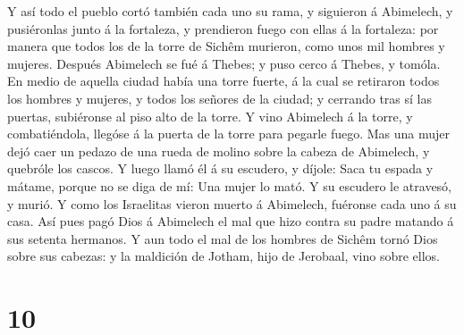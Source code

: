  Y así todo el pueblo cortó también cada uno su rama, y
siguieron á Abimelech, y pusiéronlas junto á la fortaleza, y prendieron
fuego con ellas á la fortaleza: por manera que todos los de la torre de
Sichêm murieron, como unos mil hombres y mujeres. 
Después Abimelech se fué á Thebes; y puso cerco á Thebes, y tomóla.
 En medio de aquella ciudad había una torre fuerte, á la
cual se retiraron todos los hombres y mujeres, y todos los señores de la
ciudad; y cerrando tras sí las puertas, subiéronse al piso alto de la
torre.  Y vino Abimelech á la torre, y combatiéndola,
llegóse á la puerta de la torre para pegarle fuego.  Mas
una mujer dejó caer un pedazo de una rueda de molino sobre la cabeza de
Abimelech, y quebróle los cascos.  Y luego llamó él á su
escudero, y díjole: Saca tu espada y mátame, porque no se diga de mí:
Una mujer lo mató. Y su escudero le atravesó, y murió.  Y
como los Israelitas vieron muerto á Abimelech, fuéronse cada uno á su
casa.  Así pues pagó Dios á Abimelech el mal que hizo
contra su padre matando á sus setenta hermanos.  Y aun
todo el mal de los hombres de Sichêm tornó Dios sobre sus cabezas: y la
maldición de Jotham, hijo de Jerobaal, vino sobre ellos.

\hypertarget{section-9}{%
\section{10}\label{section-9}}

